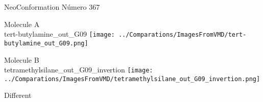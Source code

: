 \vtab[-2cm]
\begin{center}
{\large NeoConformation \tab Número 367}
\end{center}
\begin{multicols}{2}
\begin{center}
Molecule A \\ 
tert-butylamine\_out\_G09
\texttt{[image: ../Comparations/ImagesFromVMD/tert-butylamine\_out\_G09.png]}
\\
\vtab

\columnbreak
Molecule B \\ 
tetramethylsilane\_out\_G09\_invertion
\texttt{[image: ../Comparations/ImagesFromVMD/tetramethylsilane\_out\_G09\_invertion.png]}
\\
\vtab


\end{center}
\end{multicols}
\begin{center}
\vtab
\vtab
\textcolor{NavyBlue}{\Large Different}
\end{center}

 \newpage

